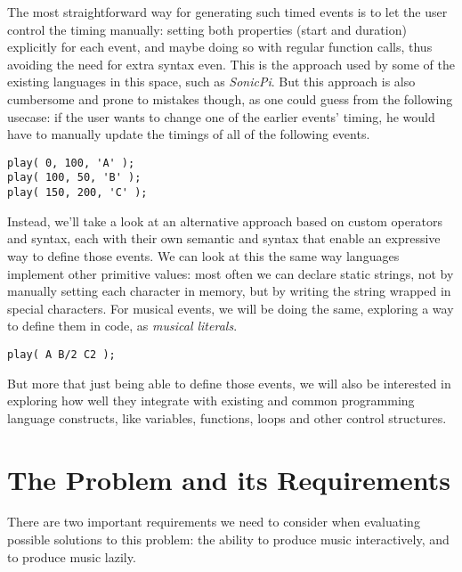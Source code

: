 \documentclass[a4paper,UKenglish,cleveref, autoref]{oasics-v2019}
\begin{document}
The most straightforward way for generating such timed events is to let the user control the timing manually: setting both properties (start and duration) explicitly for each event, and maybe doing so with regular function calls, thus avoiding the need for extra syntax even. This is the approach used by some of the existing languages in this space, such as \textit{SonicPi}. But this approach is also cumbersome and prone to mistakes though, as one could guess from the following usecase: if the user wants to change one of the earlier events' timing, he would have to manually update the timings of all of the following events.

\begin{lstlisting}[caption={Example of a hypothetical imperative API for creating events},label=list:8-6,captionpos=t,abovecaptionskip=-\medskipamount]
play( 0, 100, 'A' );
play( 100, 50, 'B' );
play( 150, 200, 'C' );
\end{lstlisting}

Instead, we'll take a look at an alternative approach based on custom operators and syntax, each with their own semantic and syntax that enable an expressive way to define those events. We can look at this the same way languages implement other primitive values: most often we can declare static strings, not by manually setting each character in memory, but by writing the string wrapped in special characters. For musical events, we will be doing the same, exploring a way to define them in code, as \textit{musical literals}.

\begin{lstlisting}[caption={Our proposed declarative syntax that calculates timings implicitly},label=list:8-6,captionpos=t,abovecaptionskip=-\medskipamount]
play( A B/2 C2 );
\end{lstlisting}

But more that just being able to define those events, we will also be interested in exploring how well they integrate with existing and common programming language constructs, like variables, functions, loops and other control structures.

\section{The Problem and its Requirements}
There are two important requirements we need to consider when evaluating possible solutions to this problem: the ability to produce music interactively, and to produce music lazily.
\end{document}
